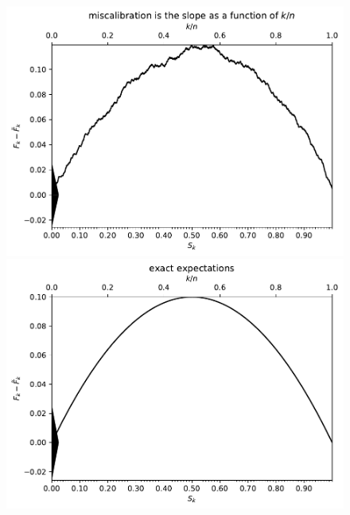\documentclass{article}
\begin{document}
\begin{figure}
\begin{centering}

\parbox{\imsize}{\includegraphics[width=\imsize]
                {./codes/unweighted/1000_10_0_0/cumulative.pdf}}
\quad\quad
\parbox{\imsize}{\includegraphics[width=\imsize]
                {./codes/unweighted/1000_10_0_0/cumulative_exact.pdf}}

\vspace{\vertsep}


\end{centering}
\end{figure}
\end{document}
